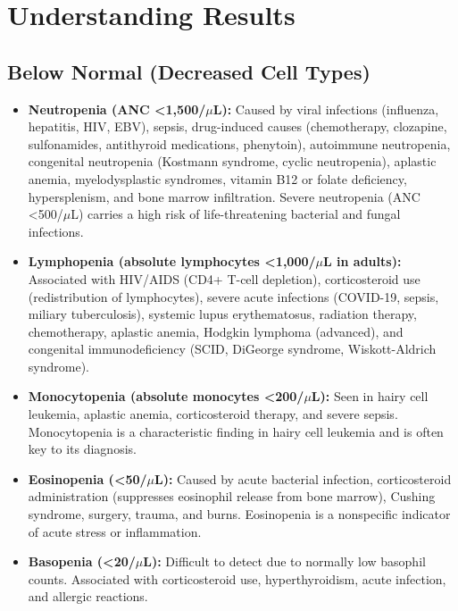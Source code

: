 \section*{Understanding Results}

\subsection*{Below Normal (Decreased Cell Types)}
\begin{itemize}
  \item \textbf{Neutropenia (ANC <1,500/$\mu$L):} Caused by viral infections (influenza, hepatitis, HIV, EBV), sepsis, drug-induced causes (chemotherapy, clozapine, sulfonamides, antithyroid medications, phenytoin), autoimmune neutropenia, congenital neutropenia (Kostmann syndrome, cyclic neutropenia), aplastic anemia, myelodysplastic syndromes, vitamin B12 or folate deficiency, hypersplenism, and bone marrow infiltration. Severe neutropenia (ANC <500/$\mu$L) carries a high risk of life-threatening bacterial and fungal infections.
  \item \textbf{Lymphopenia (absolute lymphocytes <1,000/$\mu$L in adults):} Associated with HIV/AIDS (CD4+ T-cell depletion), corticosteroid use (redistribution of lymphocytes), severe acute infections (COVID-19, sepsis, miliary tuberculosis), systemic lupus erythematosus, radiation therapy, chemotherapy, aplastic anemia, Hodgkin lymphoma (advanced), and congenital immunodeficiency (SCID, DiGeorge syndrome, Wiskott-Aldrich syndrome).
  \item \textbf{Monocytopenia (absolute monocytes <200/$\mu$L):} Seen in hairy cell leukemia, aplastic anemia, corticosteroid therapy, and severe sepsis. Monocytopenia is a characteristic finding in hairy cell leukemia and is often key to its diagnosis.
  \item \textbf{Eosinopenia (<50/$\mu$L):} Caused by acute bacterial infection, corticosteroid administration (suppresses eosinophil release from bone marrow), Cushing syndrome, surgery, trauma, and burns. Eosinopenia is a nonspecific indicator of acute stress or inflammation.
  \item \textbf{Basopenia (<20/$\mu$L):} Difficult to detect due to normally low basophil counts. Associated with corticosteroid use, hyperthyroidism, acute infection, and allergic reactions.
\end{itemize}

